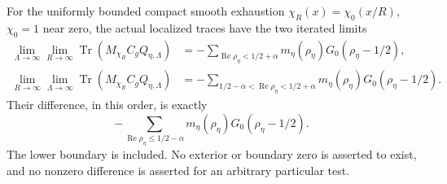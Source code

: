 For the uniformly bounded compact smooth exhaustion
$\chi_R(x)=\chi_0(x/R)$, $\chi_0=1$ near zero, the actual
localized traces have the two iterated limits
\[
 \begin{aligned}
 \lim_{\Lambda\to\infty}\lim_{R\to\infty}
    \operatorname{Tr}(M_{\chi_R}C_gQ_{\eta,\Lambda})
   &=-\sum_{\operatorname{Re}\rho_\eta<1/2+\alpha}
                     m_\eta(\rho_\eta)G_0(\rho_\eta-1/2),\\
 \lim_{R\to\infty}\lim_{\Lambda\to\infty}
    \operatorname{Tr}(M_{\chi_R}C_gQ_{\eta,\Lambda})
   &=-\sum_{1/2-\alpha<\operatorname{Re}\rho_\eta<1/2+\alpha}
                     m_\eta(\rho_\eta)G_0(\rho_\eta-1/2).
 \end{aligned}
 \tag{MA-CGP.23}
\]
Their difference, in this order, is exactly
\[
       -\sum_{\operatorname{Re}\rho_\eta\le1/2-\alpha}
                    m_\eta(\rho_\eta)G_0(\rho_\eta-1/2).
 \tag{MA-CGP.24}
\]
The lower boundary is included.  No exterior or boundary zero
is asserted to exist, and no nonzero difference is asserted
for an arbitrary particular test.

